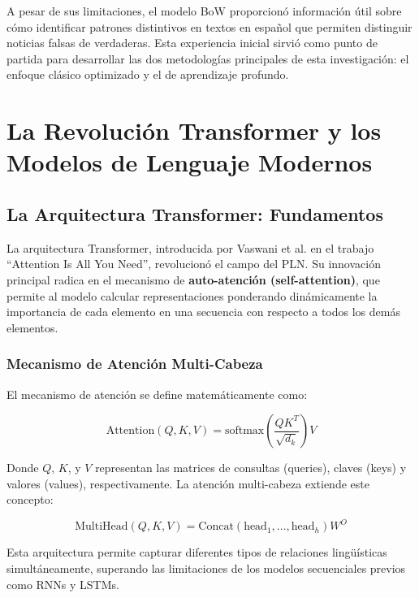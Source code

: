A pesar de sus limitaciones, el modelo BoW proporcionó información útil sobre cómo identificar patrones distintivos en textos en español que permiten distinguir noticias falsas de verdaderas. Esta experiencia inicial sirvió como punto de partida para desarrollar las dos metodologías principales de esta investigación: el enfoque clásico optimizado y el de aprendizaje profundo.

\section{La Revolución Transformer y los Modelos de Lenguaje Modernos}
\label{sec:transformers_modelos_lenguaje}

\subsection{La Arquitectura Transformer: Fundamentos}

La arquitectura Transformer, introducida por Vaswani et al. \cite{vaswani2017attention} en el trabajo ``Attention Is All You Need'', revolucionó el campo del PLN. Su innovación principal radica en el mecanismo de \textbf{auto-atención (self-attention)}, que permite al modelo calcular representaciones ponderando dinámicamente la importancia de cada elemento en una secuencia con respecto a todos los demás elementos.

\subsubsection{Mecanismo de Atención Multi-Cabeza}

El mecanismo de atención se define matemáticamente como:

\begin{equation}
\text{Attention}(Q,K,V) = \text{softmax}\left(\frac{QK^T}{\sqrt{d_k}}\right)V
\end{equation}

Donde $Q$, $K$, y $V$ representan las matrices de consultas (queries), claves (keys) y valores (values), respectivamente. La atención multi-cabeza extiende este concepto:

\begin{equation}
\text{MultiHead}(Q,K,V) = \text{Concat}(\text{head}_1, ..., \text{head}_h)W^O
\end{equation}

Esta arquitectura permite capturar diferentes tipos de relaciones lingüísticas simultáneamente, superando las limitaciones de los modelos secuenciales previos como RNNs y LSTMs.

